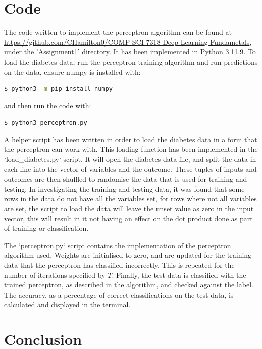 \documentclass[10pt,twocolumn,a4paper]{article}
\begin{document}
\section{Code}

The code written to implement the perceptron algorithm can be found at \url{https://github.com/CHamilton0/COMP-SCI-7318-Deep-Learning-Fundametals}, under the 'Assignment1' directory. It has been implemented in Python 3.11.9. To load the diabetes data, run the perceptron training algorithm and run predictions on the data, ensure numpy is installed with:
\begin{lstlisting}[language=bash]
  $ python3 -m pip install numpy
\end{lstlisting}
and then run the code with:
\begin{lstlisting}[language=bash]
  $ python3 perceptron.py
\end{lstlisting}
A helper script has been written in order to load the diabetes data in a form that the perceptron can work with. This loading function has been implemented in the `load\_diabetes.py` script. It will open the diabetes data file, and split the data in each line into the vector of variables and the outcome. These tuples of inputs and outcomes are then shuffled to randomise the data that is used for training and testing. In investigating the training and testing data, it was found that some rows in the data do not have all the variables set, for rows where not all variables are set, the script to load the data will leave the unset value as zero in the input vector, this will result in it not having an effect on the dot product done as part of training or classification. 

The `perceptron.py` script contains the implementation of the perceptron algorithm used. Weights are initialised to zero, and are updated for the training data that the perceptron has classified incorrectly. This is repeated for the number of iterations specified by $T$. Finally, the test data is classified with the trained perceptron, as described in the algorithm, and checked against the label. The accuracy, as a percentage of correct classifications on the test data, is calculated and displayed in the terminal.

\section{Conclusion}
\end{document}
